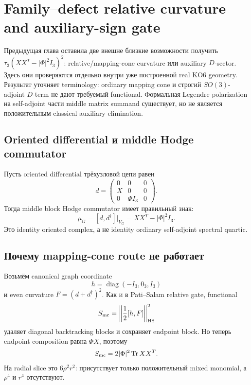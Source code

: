 \chapter{Family--defect relative curvature and auxiliary-sign gate}

Предыдущая глава оставила две внешне близкие возможности получить
\(\tau_3(XX^T-|\Phi|^2I_3)^2\): relative/mapping-cone curvature или
auxiliary \(D\)-sector. Здесь они проверяются отдельно внутри уже
построенной real KO6 geometry. Результат уточняет terminology: ordinary
mapping cone и строгий \(SO(3)\)-adjoint \(D\)-term не дают требуемый
functional. Формальная Legendre polarization на self-adjoint части middle
matrix summand существует, но не является положительным classical
auxiliary elimination.

\section{Oriented differential и middle Hodge commutator}

Пусть oriented differential трёхузловой цепи равен
\begin{equation}
 d=
 \begin{pmatrix}
 0&0&0\\
 X&0&0\\
 0&\Phi I_3&0
 \end{pmatrix}.
 \label{eq:family-oriented-quiver-differential}
\end{equation}
Тогда middle block Hodge commutator имеет правильный знак:
\begin{equation}
 \mu_G=[d,d^\dagger]\big|_{V_G}
 =XX^T-|\Phi|^2I_3.
 \label{eq:family-middle-hodge-commutator}
\end{equation}
Это identity oriented complex, а не identity ordinary self-adjoint
spectral quartic.

\section{Почему mapping-cone route не работает}

Возьмём canonical graph coordinate
\begin{equation}
 h=\operatorname{diag}(-I_3,0_3,I_3)
\end{equation}
и even curvature
\(F=(d+d^\dagger)^2\). Как и в Pati--Salam relative gate, functional
\begin{equation}
 S_{\rm mc}=\left\|\frac12[h,F]\right\|_{\rm HS}^2
 \label{eq:family-mapping-cone-functional}
\end{equation}
удаляет diagonal backtracking blocks и сохраняет endpoint block. Но теперь
endpoint composition равна \(\Phi X\), поэтому
\begin{equation}
 S_{\rm mc}=2|\Phi|^2\operatorname{Tr} XX^T.
 \label{eq:family-mapping-cone-endpoint-product}
\end{equation}
На radial slice это \(6\rho^2r^2\): присутствует только положительный
mixed monomial, а \(\rho^4\) и \(r^4\) отсутствуют.

